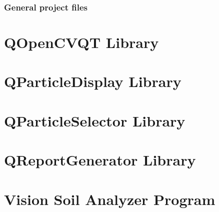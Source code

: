 \documentclass[11pt,fleqn,,a4paper,twoside,openright]{book}
\begin{document}
\subsection{General project files}




\newpage

\chapter{QOpenCVQT Library}



\newpage

\chapter{QParticleDisplay Library}



\newpage

\chapter{QParticleSelector Library}



\newpage

\chapter{QReportGenerator Library}



\newpage

\chapter{Vision Soil Analyzer Program}
\end{document}
